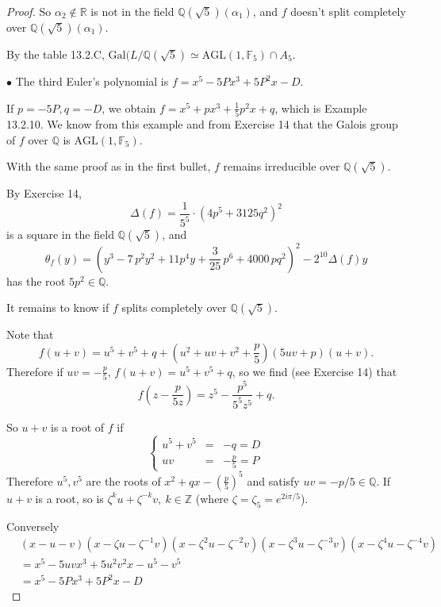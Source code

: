 \documentclass[11pt,a4paper]{article}
\newcommand{\Q}{\mathbb{Q}}
\newcommand{\Z}{\mathbb{Z}}
\newcommand{\R}{\mathbb{R}}
\newcommand{\F}{\mathbb{F}}
\newcommand{\Gal}{\mathrm{Gal}}
\begin{document}
\begin{proof}
So $\alpha_2 \not \in \R$ is not in the field $\Q(\sqrt{5})(\alpha_1)$, and $f$ doesn't split completely over $\Q(\sqrt{5})(\alpha_1)$.

By the table 13.2.C, $\Gal(L/\Q(\sqrt{5}) \simeq \mathrm{AGL}(1,\F_5)\cap A_5$.

 \item[$\bullet$] The third Euler's polynomial is $f = x^5 - 5Px^3 + 5P^2 x - D$.
   
   If $p = -5P,q = -D$, we obtain $f = x^5+ p x^3 +\frac{1}{5} p^2x +q$, which is Example 13.2.10. We know from this example and from Exercise 14 that the Galois group of $f$ over $\Q$ is $\mathrm{AGL}(1,\F_5)$.
  
With the same proof as in the first bullet, $f$ remains irreducible over $\Q(\sqrt{5})$.
 
 By Exercise 14,
 $$
\Delta(f) =\frac{1}{5^5} \cdot (4 p^{5} + 3125 q^{2})^{2}
$$
is a square in the field $\Q(\sqrt{5})$, and 
$$\theta_f(y) = \left(y^3-7 \, p^{2}y^2+11 p^{4}y+\frac{3}{25} \, p^{6} + 4000 \, p q^{2}\right)^2 - 2^{10}\Delta(f) y
$$
has the root $5p^2 \in \Q$.

It remains to know if $f$ splits completely over $\Q(\sqrt{5})$.

   Note that
   $$f(u+v) = u^5 + v^5 + q + (u^2 + uv + v^2 +\frac{p}{5})(5 uv +p)(u+v).$$
   Therefore if $uv = -\frac{p}{5}$, $f(u + v) = u^5 +v^5 +q$, so we find (see Exercise 14) that
   $$f\left(z - \frac{p}{5z}\right) = z^5 - \frac{p^5}{5^5 z^5} + q.$$
  
   So $u+v$ is a root of $f$ if 
   $$
\left\{
\begin{array}{rcc}
  u^5 + v^5 &   = & -q  = D \\
  uv &   = &  -\frac{p}{5}  =P 
\end{array}
\right.
   $$
   Therefore $u^5, v^5$ are the roots of $x^2 + qx -(\frac{p}{5})^5$ and satisfy $uv = -p/5 \in \Q$. If $u+v$ is a root, so is $\zeta^k u + \zeta^{-k} v, \ k \in \Z$ (where $\zeta = \zeta_5 = e^{2i\pi/5}$).
  
   
   Conversely
  \begin{align*}
  &(x - u-v) (x - \zeta u - \zeta^{-1}v)(x - \zeta^2 u - \zeta^{-2}v)(x - \zeta^3 u - \zeta^{-3}v)(x - \zeta^4 u - \zeta^{-4}v) \\
  &= x^5 -5 uv x^3 + 5u^2v^2 x - u^5 -v^5\\
  &= x^5 -5 Px^3 + 5 P^2 x - D
  \end{align*}
  

\end{proof}
\end{document}
